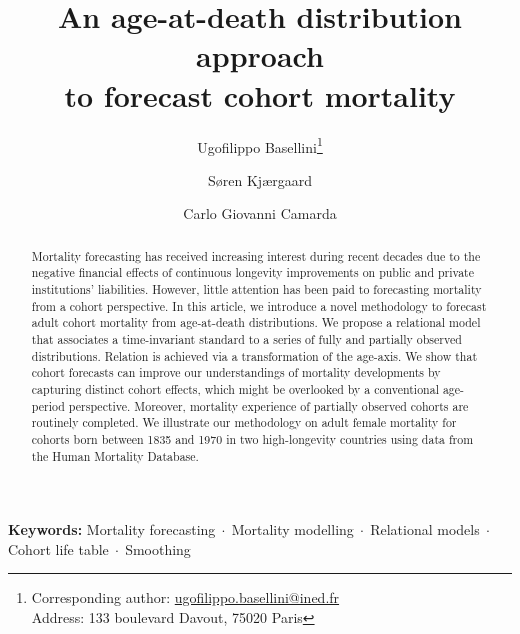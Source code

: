\documentclass[11pt, a4paper]{article}
\begin{document}
	
	
	\title{An age-at-death distribution approach \\ to forecast cohort mortality}	
	
	\author[1,2]{Ugofilippo Basellini\thanks{Corresponding author: \url{ugofilippo.basellini@ined.fr}\\
	\hspace*{1.8em}Address: 133 boulevard Davout, 75020 Paris}}
	\author[2]{S{\o}ren Kj{\ae}rgaard}
	\author[1]{Carlo Giovanni Camarda}
	
	\maketitle 
 
\begin{abstract}

Mortality forecasting has received increasing interest during recent decades due to the negative financial effects of continuous longevity improvements on public and private institutions' liabilities. However, little attention has been paid to forecasting mortality from a cohort perspective. In this article, we introduce a novel methodology to forecast adult cohort mortality from age-at-death distributions. We propose a relational model that associates a time-invariant standard to a series of fully and partially observed distributions. Relation is achieved via a transformation of the age-axis. We show that cohort forecasts can improve our understandings of mortality developments by capturing distinct cohort effects, which might be overlooked by a conventional age-period perspective. Moreover, mortality experience of partially observed cohorts are routinely completed. We illustrate our methodology on adult female mortality for cohorts born between 1835 and 1970 in two high-longevity countries using data from the Human Mortality Database.

\end{abstract}

\noindent \textbf{Keywords:} Mortality forecasting$\;\cdot\;$Mortality modelling$\;\cdot\;$Relational models$\;\cdot\;$Cohort life table$\;\cdot\;$Smoothing	
\end{document}
